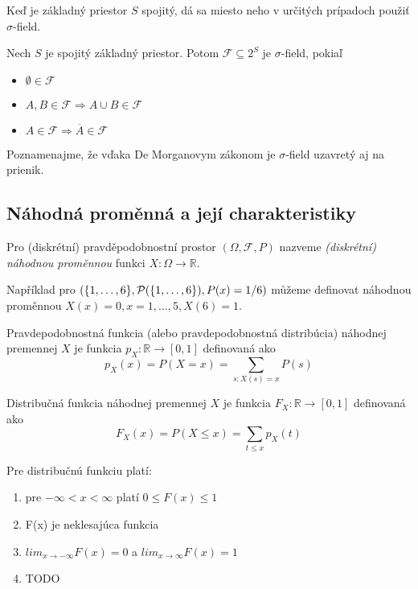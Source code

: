 Keď je základný priestor $S$ spojitý, dá sa miesto neho
v určitých prípadoch použiť $\sigma$-field.

\begin{definition}
	Nech $S$ je spojitý základný priestor. Potom $\mathscr{F} \subseteq 2^S$
	je $\sigma$-field, pokiaľ
	\begin{itemize}
		\item $\emptyset \in \mathscr{F}$
		\item $A,B \in \mathscr{F} \Rightarrow A \cup B \in \mathscr{F}$
		\item $A \in \mathscr{F} \Rightarrow \overline{A} \in \mathscr{F}$
	\end{itemize}
\end{definition}

Poznamenajme, že vďaka De Morganovym zákonom je $\sigma$-field uzavretý
aj na prienik.

\subsection{Náhodná proměnná a její charakteristiky}

\begin{definition}
    Pro (diskrétní) pravděpodobnostní prostor $(\Omega, \mathcal{F}, P)$
    nazveme {\em (diskrétní) náhodnou proměnnou} funkci $X : \Omega \to \mathbb{R}$.
\end{definition}

\begin{example}
    Například pro
    $(\{1,\ldots,6\}, \mathcal{P}(\{1,\ldots,6\}), P(x) = 1/6)$
    můžeme definovat náhodnou proměnnou
    $X(x) = 0, x = 1,\ldots,5, X(6) = 1$.
\end{example}

\begin{definition}
    Pravdepodobnostná funkcia (alebo pravdepodobnostná distribúcia)
	náhodnej premennej $X$ je funkcia $p_X: \mathbb{R} \to [0,1]$ definovaná ako
	\[
    p_X(x) = P(X=x) = \sum_{s:X(s)=x}P(s)
    \]
\end{definition}

\begin{definition}
    Distribučná funkcia
	náhodnej premennej $X$ je funkcia $F_X: \mathbb{R} \to [0,1]$ definovaná ako
	\[
    F_X(x) = P(X\leq x) = \sum_{t \leq x}p_X(t)
    \]
\end{definition}

Pre distribučnú funkciu platí:
\begin{enumerate}
	\item pre $-\infty < x < \infty$ platí $0 \leq F(x) \leq 1$
	\item F(x) je neklesajúca funkcia
	\item $lim_{x \to -\infty}F(x) = 0$ a $lim_{x \to \infty}F(x) = 1$
	\item TODO
\end{enumerate}

